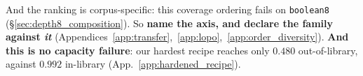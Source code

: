 \noindent And the ranking is corpus-specific: this coverage ordering fails on \texttt{boolean8} (\S\ref{sec:depth8_composition}). So \textbf{name the axis, and declare the family against \emph{it}} (Appendices~\ref{app:transfer},~\ref{app:lopo},~\ref{app:order_diversity}). \textbf{And this is no capacity failure}: our hardest recipe reaches only $0.480$ out-of-library, against $0.992$ in-library (App.~\ref{app:hardened_recipe}).

